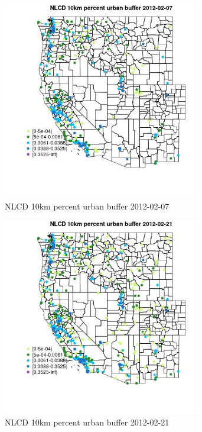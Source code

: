 \begin{figure} 
\centering  
\includegraphics[width=0.77\textwidth]{Code_Outputs/Report_ML_input_PM25_Step4_part_f_de_duplicated_aves_prioritize_24hr_obswNAs_MapObsNLCD_10km_percent_urban_buffer2012-02-07.jpg} 
\caption{\label{fig:Report_ML_input_PM25_Step4_part_f_de_duplicated_aves_prioritize_24hr_obswNAsMapObsNLCD_10km_percent_urban_buffer2012-02-07}NLCD 10km percent urban buffer 2012-02-07} 
\end{figure} 
 

\begin{figure} 
\centering  
\includegraphics[width=0.77\textwidth]{Code_Outputs/Report_ML_input_PM25_Step4_part_f_de_duplicated_aves_prioritize_24hr_obswNAs_MapObsNLCD_10km_percent_urban_buffer2012-02-21.jpg} 
\caption{\label{fig:Report_ML_input_PM25_Step4_part_f_de_duplicated_aves_prioritize_24hr_obswNAsMapObsNLCD_10km_percent_urban_buffer2012-02-21}NLCD 10km percent urban buffer 2012-02-21} 
\end{figure} 
 


